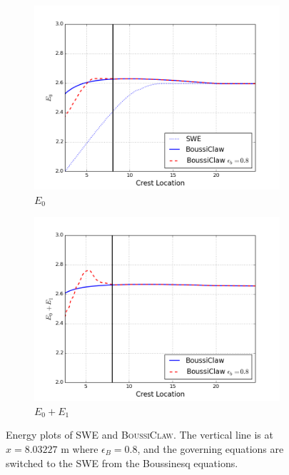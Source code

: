 \documentclass[review]{elsarticle}
\begin{document}
\begin{figure}[!htb]
    \centering
    \begin{subfigure}[b]{0.45\textwidth}
        \includegraphics[width=\textwidth]{_fig/e0_dgeo_eb08.png}
        \caption{$E_0$}
        \label{fig:e0_dgeo_eb08}
    \end{subfigure}
    \begin{subfigure}[b]{0.45\textwidth}
        \includegraphics[width=\textwidth]{_fig/e1_dgeo_eb08.png}
        \caption{$E_0+E_1$}
        \label{fig:e1_dgeo_eb08}
    \end{subfigure}
    \caption{Energy plots of SWE and \textsc{BoussiClaw}.
    The vertical line is at $x=8.03227$ m where $\epsilon_B=0.8$,
    and the governing equations are switched to the SWE from
    the Boussinesq equations. }
    \label{fig:energy_dgeo_swe}
\end{figure}
\end{document}

